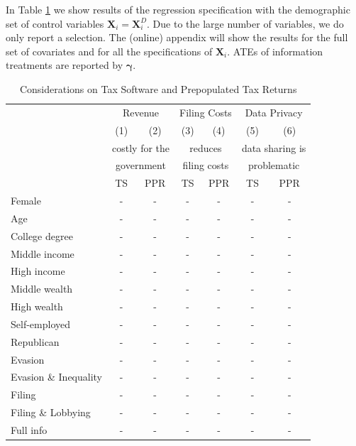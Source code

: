 \documentclass[11pt]{article}
\begin{document}
In Table \ref{tab:considerationsts} we show results of the regression specification with the demographic set of control variables $\mathbf{X}_{i} = \mathbf{X}_{i}^{D}$. Due to the large number of variables, we do only report a selection. The (online) appendix will show the results for the full set of covariates and for all the specifications of $\mathbf{X}_{i}$. ATEs of information treatments are reported by $\boldsymbol{\gamma}$.

\begin{table}[!htbp]\centering
\caption{Considerations on Tax Software and Prepopulated Tax Returns}
\label{tab:considerationsts}
\begin{threeparttable}
\begin{tabular}{l|cc|cc|cc}
\toprule
 & \multicolumn{2}{c|}{Revenue} & \multicolumn{2}{c|}{Filing Costs} & \multicolumn{2}{c}{Data Privacy}\\[0.5em]
 & (1) & (2) & (3) & (4) & (5) & (6) \\[0.5em]
 & \multicolumn{2}{c|}{costly for the} & \multicolumn{2}{c|}{reduces} & \multicolumn{2}{c}{data sharing is}\\
 & \multicolumn{2}{c|}{government} & \multicolumn{2}{c|}{filing costs} & \multicolumn{2}{c}{problematic} \\[0.5em]
  & TS & PPR  & TS & PPR & TS & PPR  \\
\midrule
Female                     &-& - & - &-& - & - \\
Age                        &-& - & - &-& - & - \\
College degree             &-& - & - &-& - & - \\
Middle income              &-& - & - &-& - & - \\
High income                &-& - & - &-& - & - \\
Middle wealth              &-& - & - &-& - & - \\
High wealth                &-& - & - &-& - & - \\
Self-employed              &-& - & - &-& - & - \\
Republican                 &-& - & - &-& - & - \\[1em]

Evasion        & - & - & - & - & - & - \\
Evasion \& Inequality     & - & - & - & - & - & - \\
Filing            & - & - & - & - & - & - \\
Filing \& Lobbying           & - & - & - & - & - & - \\
Full info               & - & - & - & - & - & - \\[0.5em]


\end{tabular}
\end{threeparttable}
\end{table}
\end{document}
